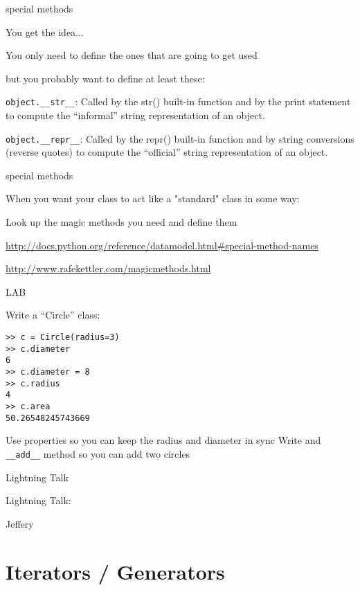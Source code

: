 \documentclass{beamer}
\begin{document}
\begin{frame}[fragile]{special methods}

{\Large You get the idea...}

\vfill
{\Large You only need to define the ones that are going to get used}

\vfill
{\Large but you probably want to define at least these:}

\vfill
\verb|object.__str__|: Called by the str() built-in function and by the print statement to compute the “informal” string representation of an object.

\vfill
\verb|object.__repr__|: Called by the repr() built-in function and by string conversions (reverse quotes) to compute the “official” string representation of an object.

\end{frame} 

\begin{frame}[fragile]{special methods}

\vfill
{\Large When you want your class to act like a "standard" class in some way:}

\vfill
{\Large Look up the magic methods you need and define them}

\vfill
\url{http://docs.python.org/reference/datamodel.html#special-method-names}

\vfill
\url{http://www.rafekettler.com/magicmethods.html}
\end{frame} 

\begin{frame}[fragile]{LAB}

{\Large Write a ``Circle'' class:}
\begin{verbatim}
>> c = Circle(radius=3)
>> c.diameter
6
>> c.diameter = 8
>> c.radius 
4
>> c.area
50.26548245743669
\end{verbatim}
{\Large Use properties so you can keep the radius and diameter in sync}
{\Large Write and \verb|__add__| method so you can add two circles}
\end{frame}

\begin{frame}{Lightning Talk}

{\centering

\vfill
{\LARGE Lightning Talk:  }

\vfill
{\Huge Jeffery}

\vfill
}
\end{frame}

\section{Iterators / Generators}
\end{document}
